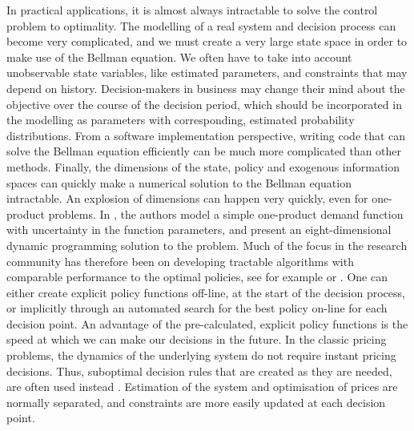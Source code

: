 \documentclass[main.tex]{subfiles}
\begin{document}
In practical applications, it is almost always
intractable to solve the control problem to optimality.
The modelling of a real system and decision process can become very
complicated, and  we must  create a very
large state space in order to make use of the Bellman equation.
We often have to take into account unobservable
state variables, like estimated parameters, and constraints
that may depend on history. Decision-makers in business may change their mind
about the objective over the course of the decision period, which should
be incorporated in the modelling as parameters with corresponding, estimated
probability distributions.
From a software implementation perspective, writing code that can
solve the Bellman equation efficiently can be much more complicated
than other methods.
Finally, the dimensions of the state, policy and exogenous
information spaces can quickly make a numerical solution to the Bellman
equation intractable. An explosion of dimensions can happen very
quickly, even for one-product problems. In
\cite{bertsimas2001dynamic}, the authors model a simple
one-product demand function with uncertainty in the function
parameters, and present an eight-dimensional dynamic programming
solution to the problem.
Much of the focus in the research community has therefore been on
developing tractable algorithms with comparable performance to the
optimal policies, see for example
\cite{powell2011approximate} or \cite{bertsekas2012dynamic}.
One can either create explicit policy functions off-line, at the
start of the decision process, or implicitly through an automated
search for the best policy on-line for each decision point.
An advantage of the pre-calculated, explicit policy functions
is the speed at which we can make our decisions in the
future. In the classic pricing problems, the dynamics of the
underlying system do not require instant pricing decisions. Thus,
suboptimal decision rules that are created as they are needed, are often used
instead \cite{talluri2006theory}. Estimation of the system and optimisation of prices are
normally separated, and constraints are more easily updated at each
decision point.
\end{document}

